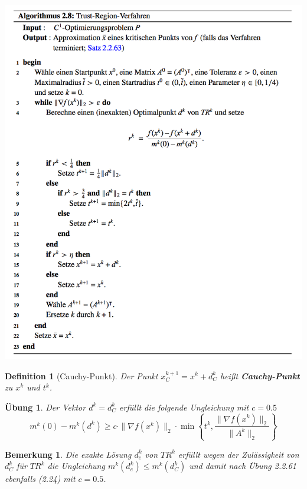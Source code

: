 \documentclass[11pt]{scrreprt}
\newcounter{thm}
\theoremstyle{thmstyle}
\numberwithin{thm}{section}
\newtheorem{bemerkung}[thm]{Bemerkung}
\newtheorem{definition}[thm]{Definition}
\newtheorem{uebung}[thm]{Übung}
\begin{document}
\begin{center}
	\includegraphics[scale=0.75]{a28}
\end{center}

\begin{definition}[Cauchy-Punkt]
	Der Punkt $x_C^{k+1}	 = x^k + d^k_C$ heißt \textbf{Cauchy-Punkt} zu $x^k$ und $t^k$.
\end{definition}

\begin{uebung}
	Der Vektor $d^k = d_C^k$ erfüllt die folgende Ungleichung mit $c = 0.5$
	\begin{equation}
		m^k(0) - m^k(d^k) \geq c \cdot \| \nabla f(x^k) \|_2 \cdot \min \left\{ t^k, \frac{\| \nabla f(x^k) \|_2}{\| A^k \|_2} \right\}  \tag*{(2.24)}
	\end{equation}
	$$ $$
\end{uebung}

\begin{bemerkung} 
	Die exakte Lösung $d_e^k$ von $TR^k$ erfüllt wegen der Zulässigkeit von $d_C^k$ für $TR^k$ die Ungleichung $m^k (d_e^k) \leq m^k (d_C^k)$ und damit nach Übung 2.2.61 ebenfalls (2.24) mit $c = 0.5$.	
\end{bemerkung}
\end{document}
